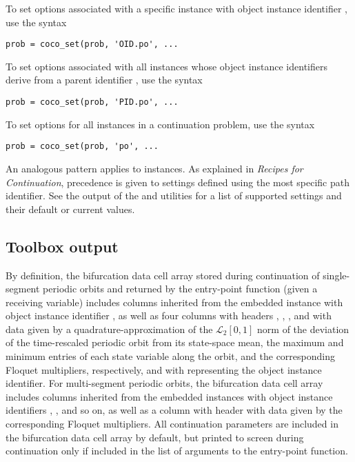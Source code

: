 To set options associated with a specific  instance with object instance identifier , use the syntax
\begin{lstlisting}[language=coco-highlight]
prob = coco_set(prob, 'OID.po', ...
\end{lstlisting}
To set options associated with all  instances whose object instance identifiers derive from a parent identifier , use the syntax
\begin{lstlisting}[language=coco-highlight]
prob = coco_set(prob, 'PID.po', ...
\end{lstlisting}
To set options for all  instances in a continuation problem, use the syntax 
\begin{lstlisting}[language=coco-highlight]
prob = coco_set(prob, 'po', ...
\end{lstlisting}
An analogous pattern applies to  instances. As explained in \emph{Recipes for Continuation}, precedence is given to settings defined using the most specific path identifier. See the output of the  and  utilities for a list of supported settings and their default or current values.

\subsection{Toolbox output}
By definition, the bifurcation data cell array stored during continuation of single-segment periodic orbits and returned by the  entry-point function (given a receiving variable) includes columns inherited from the embedded  instance with object instance identifier , as well as four columns with headers , , , and  with data given by a quadrature-approximation of the $\mathcal{L}_2[0,1]$ norm of the deviation of the time-rescaled periodic orbit from its state-space mean, the maximum and minimum entries of each state variable along the orbit, and the corresponding Floquet multipliers, respectively, and with  representing the  object instance identifier. For multi-segment periodic orbits, the bifurcation data cell array includes columns inherited from the embedded  instances with object instance identifiers , , and so on, as well as a column with header   with data given by the corresponding Floquet multipliers. All continuation parameters are included in the bifurcation data cell array by default, but printed to screen during continuation only if included in the list of arguments to the  entry-point function.

